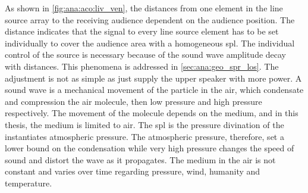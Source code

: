 
As shown in \autoref{fig:ana:aco:liv_ven}, the distances from one element in the line source array to the receiving audience dependent on the audience position. The distance indicates that the signal to every line source element has to be set individually to cover the audience area with a homogeneous \gls{spl}. The individual control of the source is necessary because of the sound wave amplitude decay with distances. This phenomena is addressed in \autoref{sec:ana:geo_spr_los}. The adjustment is not as simple as just supply the upper speaker with more power. A sound wave is a mechanical movement of the particle in the air, which condensate and compression the air molecule, then low pressure and high pressure respectively. The movement of the molecule depends on the medium, and in this thesis, the medium is limited to air. The \gls{spl} is the pressure divination of the instantiates atmospheric pressure. The atmospheric pressure, therefore, set a lower bound on the condensation while very high pressure changes the speed of sound and distort the wave as it propagates.  The medium in the air is not constant and varies over time regarding pressure, wind, humanity and temperature. 


